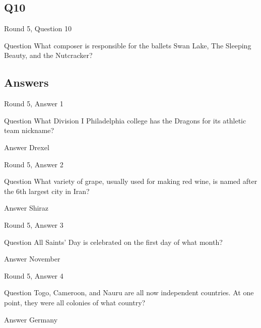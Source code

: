 \documentclass[11pt]{beamer}
\begin{document}
\subsection*{Q10}
\begin{frame}[t]{Round 5, Question 10}
\vspace{2em}
\begin{block}{Question}
What composer is responsible for the ballets Swan Lake, The Sleeping Beauty, and the Nutcracker\@?
\end{block}
\end{frame}
    
\subsection{Answers}

\begin{frame}[t]{Round 5, Answer 1}
\vspace{2em}
\begin{block}{Question}
What Division I Philadelphia college has the Dragons for its athletic team nickname\@?
\end{block}
\pause{}
\begin{block}{Answer}
Drexel
\end{block}
\end{frame}
    

\begin{frame}[t]{Round 5, Answer 2}
\vspace{2em}
\begin{block}{Question}
What variety of grape, usually used for making red wine, is named after the 6th largest city in Iran\@?
\end{block}
\pause{}
\begin{block}{Answer}
Shiraz
\end{block}
\end{frame}
    

\begin{frame}[t]{Round 5, Answer 3}
\vspace{2em}
\begin{block}{Question}
All Saints' Day is celebrated on the first day of what month\@?
\end{block}
\pause{}
\begin{block}{Answer}
November
\end{block}
\end{frame}
    

\begin{frame}[t]{Round 5, Answer 4}
\vspace{2em}
\begin{block}{Question}
Togo, Cameroon, and Nauru are all now independent countries. At one point, they were all colonies of what country\@?
\end{block}
\pause{}
\begin{block}{Answer}
Germany
\end{block}
\end{frame}
    
\end{document}
